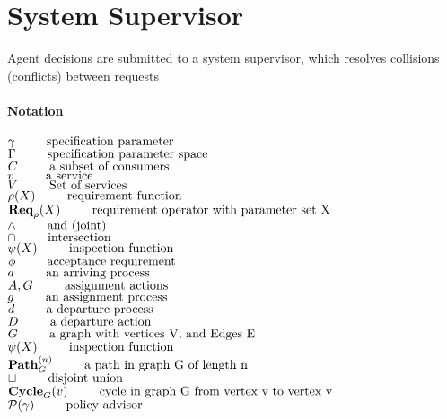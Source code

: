 \documentclass{article}
\newenvironment{notation}
{
    \newpage

    \paragraph{\Huge Notation}
    \begin{flushleft}
}
{
    \end{flushleft}
}
\newcommand{\notate}[2]{$#1 \hspace{0.35in} \mbox{#2}$}
\theoremstyle{definition}
\theoremstyle{remark}
\newcommand{\reqop}[2]{\mathbf{Req}_{#1}(#2)}
\newcommand{\path}[2]{\mathbf{Path}^{#2}_{#1}}
\newcommand{\cyclepath}[1]{\mathbf{Cycle}_{#1}}
\begin{document}
	\section{System Supervisor}

	Agent decisions are submitted to a system supervisor, which resolves collisions (conflicts) between requests
	\newpage

	\begin{notation}
		\notate{\gamma}{specification parameter}\\
		\notate{\Gamma}{specification parameter space}\\
		\notate{C}{a subset of consumers}\\
		\notate{v}{a service}\\
		\notate{V}{Set of services}\\
		\notate{\rho(X)}{requirement function}\\
		\notate{\reqop{\rho}{X}}{requirement operator with parameter set X}\\
    \notate{\wedge}{and (joint)}\\
    \notate{\cap}{intersection}\\
    \notate{\psi(X)}{inspection function}\\
    \notate{\phi}{acceptance requirement}\\
		\notate{a}{an arriving process}\\
		\notate{A,G}{assignment actions}\\
		\notate{g}{an assignment process}\\
		\notate{d}{a departure process}\\
		\notate{D}{a departure action}\\
    \notate{G}{a graph with vertices V, and Edges E}\\
    \notate{\psi(X)}{inspection function}\\
    \notate{\path{G}{(n)}}{a path in graph G of length n}\\
    \notate{\sqcup}{disjoint union}\\
    \notate{\cyclepath{G}(v)}{cycle in graph G from vertex v to vertex v}\\
    \notate{\mathcal{P}(\gamma)}{policy advisor}
  \end{notation}

	\newpage
\end{document}
